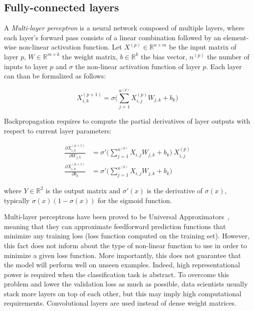     \subsection{Fully-connected layers}

        A \textit{Multi-layer perceptron} is a neural network composed of multiple layers,
        where each layer's forward pass consists of a linear combination
        followed by an element-wise non-linear activation function.
        Let $X^{(p)} \in \mathbb{R}^{n \times m}$ be the input matrix of layer $p$,  %
        $W \in \mathbb{R}^{m \times k}$ the weight matrix,  %
        $b \in \mathbb{R}^{k}$ the bias vector, $n^{(p)}$ the number of inputs to layer $p$  %
        and $\sigma$ the non-linear activation function of layer $p$.
        Each layer can than be formalized as follows:

        \begin{equation}
            X_{i, k}^{(p+1)} = \sigma \Big( \sum\limits_{j=1}^{n^{(p)}} X^{(p)}_{i, j} W_{j, k} + b_{k} \Big)  %
        \end{equation}

        Backpropagation requires to compute the partial derivatives of layer outputs with respect to current layer parameters:

        \begin{align}
            \frac{\partial X_{i, k}^{(p+1)}}{\partial W_{j, k}} & = \sigma' \Big( \sum\limits_{j=1}^{n^{(p)}} X_{i, j} W_{j, k} + b_{k} \Big) \ X_{i, j}^{(p)} \\
            \frac{\partial X_{i, k}^{(p+1)}}{\partial b_{k}} & = \sigma' \Big( \sum\limits_{j=1}^{n^{(p)}} X_{i, j} W_{j, k} + b_{k} \Big)
        \end{align}

        where $Y \in \mathbb{R}^2$ is the output matrix and $\sigma'(x)$ is the derivative of $\sigma(x)$,  %
        typically $\sigma(x) (1 - \sigma(x))$ for the sigmoid function.

        Multi-layer perceptrons have been proved to be Universal Approximators~\cite{hornik1991approximation},
        meaning that they can approximate feedforward prediction functions that minimize any training loss (loss function computed on the training set).
        However, this fact does not inform about the type of non-linear function to use in order to minimize
        a given loss function. More importantly, this does not guarantee that the model will perform well on unseen examples.
        Indeed, high representational power is required when the classification task is abstract.
        To overcome this problem and lower the validation loss as much as possible, data scientists usually stack more layers on top of each other,
        but this may imply high computational requirements. Convolutional layers are used instead of dense weight matrices.


